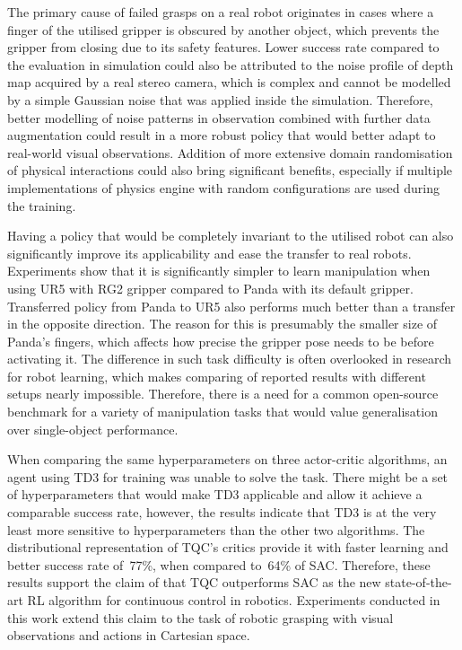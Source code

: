 The primary cause of failed grasps on a real robot originates in cases where a finger of the utilised gripper is obscured by another object, which prevents the gripper from closing due to its safety features. Lower success rate compared to the evaluation in simulation could also be attributed to the noise profile of depth map acquired by a real stereo camera, which is complex and cannot be modelled by a simple Gaussian noise that was applied inside the simulation. Therefore, better modelling of noise patterns in observation combined with further data augmentation could result in a more robust policy that would better adapt to real-world visual observations. Addition of more extensive domain randomisation of physical interactions could also bring significant benefits, especially if multiple implementations of physics engine with random configurations are used during the training.

Having a policy that would be completely invariant to the utilised robot can also significantly improve its applicability and ease the transfer to real robots. Experiments show that it is significantly simpler to learn manipulation when using UR5 with RG2 gripper compared to Panda with its default gripper. Transferred policy from Panda to UR5 also performs much better than a transfer in the opposite direction. The reason for this is presumably the smaller size of Panda's fingers, which affects how precise the gripper pose needs to be before activating it. The difference in such task difficulty is often overlooked in research for robot learning, which makes comparing of reported results with different setups nearly impossible. Therefore, there is a need for a common open-source benchmark for a variety of manipulation tasks that would value generalisation over single-object performance.

When comparing the same hyperparameters on three actor-critic algorithms, an agent using TD3 for training was unable to solve the task. There might be a set of hyperparameters that would make TD3 applicable and allow it achieve a comparable success rate, however, the results indicate that TD3 is at the very least more sensitive to hyperparameters than the other two algorithms. The distributional representation of TQC's critics provide it with faster learning and better success rate of~77\%, when compared to~64\% of SAC. Therefore, these results support the claim of \citet{kuznetsov_controlling_2020} that TQC outperforms SAC as the new state-of-the-art RL algorithm for continuous control in robotics. Experiments conducted in this work extend this claim to the task of robotic grasping with visual observations and actions in Cartesian space.

